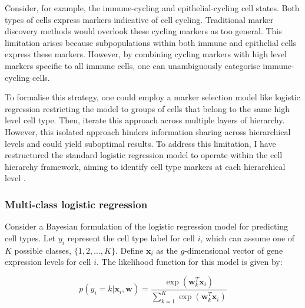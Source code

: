 Consider, for example, the immune-cycling and epithelial-cycling cell states. Both types of cells express markers indicative of cell cycling. Traditional marker discovery methods would overlook these cycling markers as too general. This limitation arises because subpopulations within both immune and epithelial cells express these markers. However, by combining cycling markers with high level markers specific to all immune cells, one can unambiguously categorise immune-cycling cells.

To formalise this strategy, one could employ a marker selection model like logistic regression restricting the model to groups of cells that belong to the same high level cell type. Then, iterate this approach across multiple layers of hierarchy. However, this isolated approach hinders information sharing across hierarchical levels and could yield suboptimal results. To address this limitation, I have restructured the standard logistic regression model to operate within the cell hierarchy framework, aiming to identify cell type markers at each hierarchical level .


\subsubsection*{Multi-class logistic regression}

Consider a Bayesian formulation of the logistic regression model for predicting cell types. Let $y_i$ represent the cell type label for cell $i$, which can assume one of $K$ possible classes, $\{1, 2, \ldots, K\}$. Define $\mathbf{x}_i$ as the $g$-dimensional vector of gene expression levels for cell $i$. The likelihood function for this model is given by:

\begin{equation}
    \label{eq:logistic-regression-likelihood}
    p(y_i = k | \mathbf{x}_i, \mathbf{w}) = \frac{\exp(\mathbf{w}_{k}^T \mathbf{x}_i)}{\sum_{k=1}^{K} \exp(\mathbf{w}_{k}^T \mathbf{x}_i)}
\end{equation}


